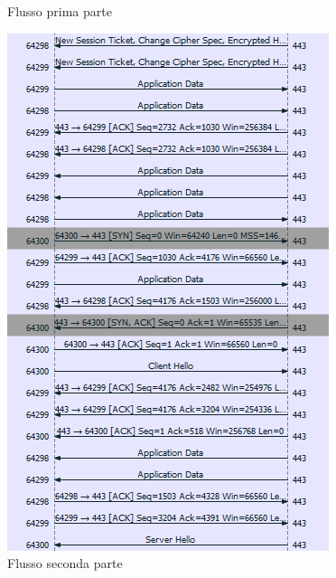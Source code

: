 \documentclass{article}
\begin{document}
\begin{figure}[!htb]
\begin{minipage}{0.3\textwidth}
      \caption{Flusso prima parte}\label{flux1}
  \end{minipage}\hfill
  \begin{minipage}{0.3\textwidth}
      \centering
      \includegraphics[width=0.9\linewidth]{flusso2.png}
      \caption{Flusso seconda parte}\label{flux2}
  \end{minipage}\hfill
  \begin{minipage}{0.3\textwidth}
    \centering

\end{minipage}
\end{figure}
\end{document}
